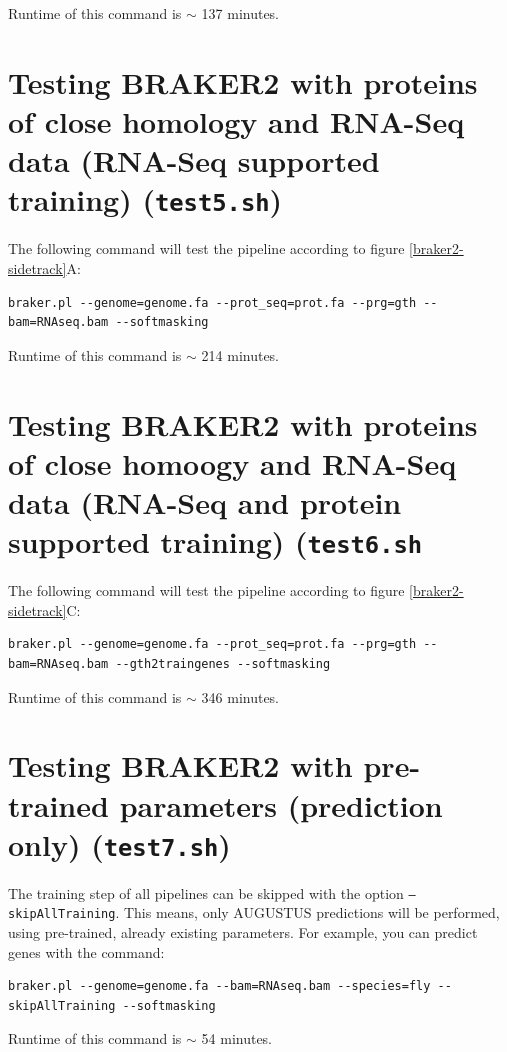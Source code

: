 \documentclass[a4paper,10pt]{report}
\begin{document}
Runtime of this command is $\sim$ 137 minutes.

\section{Testing BRAKER2 with proteins of close homology and RNA-Seq data (RNA-Seq supported training) (\texttt{test5.sh})}

The following command will test the pipeline according to figure \ref{braker2-sidetrack}A:

\begin{verbatim}
braker.pl --genome=genome.fa --prot_seq=prot.fa --prg=gth --bam=RNAseq.bam --softmasking
\end{verbatim}

Runtime of this command is $\sim$ 214 minutes.

\section{Testing BRAKER2 with proteins of close homoogy and RNA-Seq data (RNA-Seq and protein supported training) (\texttt{test6.sh}}

The following command will test the pipeline according to figure \ref{braker2-sidetrack}C:

\begin{verbatim}
braker.pl --genome=genome.fa --prot_seq=prot.fa --prg=gth --bam=RNAseq.bam --gth2traingenes --softmasking
\end{verbatim}

Runtime of this command is $\sim$ 346 minutes.

\section{Testing BRAKER2 with pre-trained parameters (prediction only) (\texttt{test7.sh})}

The training step of all pipelines can be skipped with the option \texttt{--skipAllTraining}. This means, only AUGUSTUS predictions will be performed, using pre-trained, already existing parameters. For example, you can predict genes with the command:

\begin{verbatim}
braker.pl --genome=genome.fa --bam=RNAseq.bam --species=fly --skipAllTraining --softmasking
\end{verbatim}

Runtime of this command is $\sim$ 54 minutes.
\end{document}
